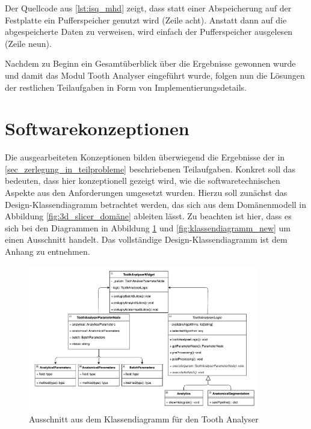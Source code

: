 Der Quellcode aus \ref{lst:isq_mhd} zeigt, dass statt einer Abspeicherung auf
der Festplatte ein Pufferspeicher genutzt wird (Zeile acht). Anstatt dann auf die
abgespeicherte Daten zu verweisen, wird einfach der Pufferspeicher ausgelesen (Zeile
neun).

Nachdem zu Beginn ein Gesamtüberblick über die Ergebnisse gewonnen wurde und
damit das Modul Tooth Analyser eingeführt wurde, folgen nun die Lösungen der restlichen
Teilaufgaben in Form von Implementierungsdetails.

\pagebreak

\section{Softwarekonzeptionen}
\label{sec:konzeptionen} Die ausgearbeiteten Konzeptionen bilden überwiegend die
Ergebnisse der in \ref{sec_zerlegung_in_teilprobleme} beschriebenen Teilaufgaben.
Konkret soll das bedeuten, dass hier konzeptionell gezeigt wird, wie die softwaretechnischen
Aspekte aus den Anforderungen umgesetzt wurden. Hierzu soll zunächst das Design-Klassendiagramm
betrachtet werden, das sich aus dem Domänenmodell in Abbildung \ref{fig:3d_slicer_domäne}
ableiten lässt. Zu beachten ist hier, dass es sich bei den Diagrammen in Abbildung
\ref{fig:klassendiagramm} und \ref{fig:klassendiagramm_new} um einen Ausschnitt handelt.
Das vollständige Design-Klassendiagramm ist dem Anhang zu entnehmen.

\begin{figure}[h]
	\centering
	\includegraphics[width=0.9\textwidth]{
		img/tooth_analyser_class_diagram_light.png
	}
	\caption{Ausschnitt aus dem Klassendiagramm für den Tooth Analyser}
	\label{fig:klassendiagramm}
\end{figure}

